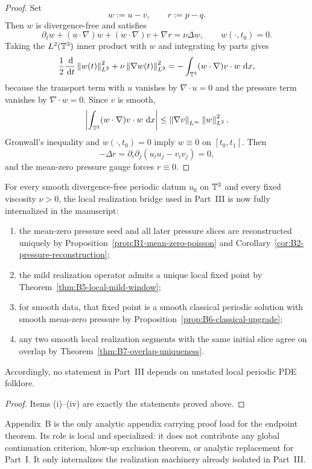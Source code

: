 \begin{proof}
Set
\[
w:=u-v,
\qquad
r:=p-q.
\]
Then $w$ is divergence-free and satisfies
\[
\partial_t w + (u\cdot\nabla)w + (w\cdot\nabla)v + \nabla r = \nu\Delta w,
\qquad
w(\cdot,t_0)=0.
\]
Taking the $L^2(\mathbb{T}^3)$ inner product with $w$ and integrating by parts gives
\[
\frac12 \frac{\,\mathrm{d}}{\,\mathrm{d} t}\left\lVert w(t)\right\rVert_{L^2}^2 + \nu \left\lVert \nabla w(t)\right\rVert_{L^2}^2
=
-\int_{\mathbb{T}^3}(w\cdot\nabla)v\cdot w\,\,\mathrm{d} x,
\]
because the transport term with $u$ vanishes by $\nabla\cdot u=0$ and the pressure term vanishes by
$\nabla\cdot w=0$. Since $v$ is smooth,
\[
\left|\int_{\mathbb{T}^3}(w\cdot\nabla)v\cdot w\,\,\mathrm{d} x\right|
\le
\left\lVert \nabla v\right\rVert_{L^\infty}\left\lVert w\right\rVert_{L^2}^2.
\]
Gronwall's inequality and $w(\cdot,t_0)=0$ imply $w\equiv 0$ on $[t_0,t_1]$. Then
\[
-\Delta r = \partial_i\partial_j(u_i u_j-v_i v_j)=0,
\]
and the mean-zero pressure gauge forces $r\equiv 0$.
\end{proof}

\begin{manualcorollary}
\label{cor:B8-local-analytic-packet}
For every smooth divergence-free periodic datum $u_0$ on $\mathbb{T}^3$ and every fixed viscosity $\nu>0$,
the local realization bridge used in Part~III is now fully internalized in the manuscript:
\begin{enumerate}[label=(\roman*), leftmargin=2.2em]
\item the mean-zero pressure seed and all later pressure slices are reconstructed uniquely by
Proposition~\ref{prop:B1-mean-zero-poisson} and Corollary~\ref{cor:B2-pressure-reconstruction};
\item the mild realization operator admits a unique local fixed point by
Theorem~\ref{thm:B5-local-mild-window};
\item for smooth data, that fixed point is a smooth classical periodic solution with smooth
mean-zero pressure by Proposition~\ref{prop:B6-classical-upgrade};
\item any two smooth local realization segments with the same initial slice agree on overlap by
Theorem~\ref{thm:B7-overlap-uniqueness}.
\end{enumerate}
Accordingly, no statement in Part~III depends on unstated local periodic PDE folklore.
\end{manualcorollary}

\begin{proof}
Items (i)--(iv) are exactly the statements proved above.
\end{proof}

\begin{remark}
Appendix~B is the only analytic appendix carrying proof load for the endpoint theorem. Its role is
local and specialized: it does not contribute any global continuation criterion, blow-up exclusion
theorem, or analytic replacement for Part~I. It only internalizes the realization machinery already
isolated in Part~III.
\end{remark}
